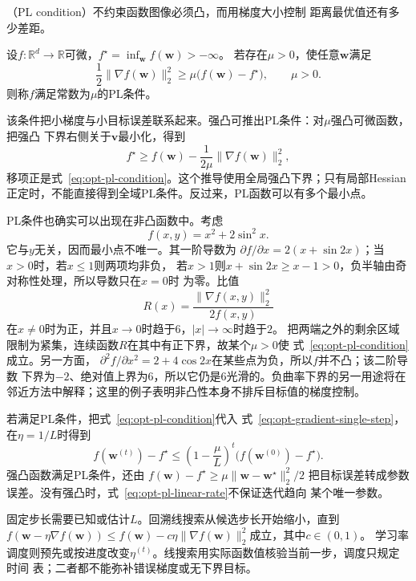 （PL condition）不约束函数图像必须凸，而用梯度大小控制
距离最优值还有多少差距。
\begin{definition}
\label{def:opt-pl-condition}
设$f:\mathbb{R}^d\to\mathbb{R}$可微，$f^\star=\inf_{\bm{w}}f(\bm{w})> -\infty$。
若存在$\mu>0$，使任意$\bm{w}$满足
\begin{equation}
  \frac{1}{2}\lVert\nabla f(\bm{w})\rVert_2^2
  \geq \mu\bigl(f(\bm{w})-f^{\star}\bigr),
  \qquad \mu>0.
  \label{eq:opt-pl-condition}
\end{equation}
则称$f$满足常数为$\mu$的PL条件。
\end{definition}
该条件把小梯度与小目标误差联系起来。强凸可推出PL条件：对$\mu$强凸可微函数，把强凸
下界右侧关于$\bm{v}$最小化，得到
\[
  f^\star\geq
  f(\bm{w})-\frac{1}{2\mu}\lVert\nabla f(\bm{w})\rVert_2^2,
\]
移项正是式~\eqref{eq:opt-pl-condition}。这个推导使用全局强凸下界；只有局部Hessian
正定时，不能直接得到全域PL条件。反过来，PL函数可以有多个最小点。

PL条件也确实可以出现在非凸函数中。考虑
\[
  f(x,y)=x^2+2\sin^2x.
\]
它与$y$无关，因而最小点不唯一。其一阶导数为
$\partial f/\partial x=2(x+\sin 2x)$；当$x>0$时，若$x\leq1$则两项均非负，
若$x>1$则$x+\sin2x\geq x-1>0$，负半轴由奇对称性处理，所以导数只在$x=0$时
为零。比值
\[
  R(x)=\frac{\lVert\nabla f(x,y)\rVert_2^2}{2f(x,y)}
\]
在$x\neq0$时为正，并且$x\to0$时趋于$6$，$|x|\to\infty$时趋于$2$。
把两端之外的剩余区域限制为紧集，连续函数$R$在其中有正下界，故某个$\mu>0$使
式~\eqref{eq:opt-pl-condition}成立。另一方面，
$\partial^2 f/\partial x^2=2+4\cos2x$在某些点为负，所以$f$并不凸；该二阶导数
下界为$-2$、绝对值上界为$6$，所以它仍是$6$光滑的。负曲率下界的另一用途将在
邻近方法中解释；这里的例子表明非凸性本身不排斥目标值的梯度控制。

若满足PL条件，把式~\eqref{eq:opt-pl-condition}代入
式~\eqref{eq:opt-gradient-single-step}，在$\eta=1/L$时得到
\begin{equation}
  f(\bm{w}^{(t)})-f^\star
  \leq
  \left(1-\frac{\mu}{L}\right)^t
  \bigl(f(\bm{w}^{(0)})-f^\star\bigr).
  \label{eq:opt-pl-linear-rate}
\end{equation}
强凸函数满足PL条件，还由
$f(\bm{w})-f^\star\geq\mu\lVert\bm{w}-\bm{w}^{\star}\rVert_2^2/2$
把目标误差转成参数误差。没有强凸时，式~\eqref{eq:opt-pl-linear-rate}不保证迭代趋向
某个唯一参数。

固定步长需要已知或估计$L$。回溯线搜索从候选步长开始缩小，直到
$f(\bm{w}-\eta\nabla f(\bm{w}))\leq
f(\bm{w})-c\eta\lVert\nabla f(\bm{w})\rVert_2^2$成立，其中$c\in(0,1)$。
学习率调度则预先或按进度改变$\eta^{(t)}$。线搜索用实际函数值核验当前一步，调度只规定时间
表；二者都不能弥补错误梯度或无下界目标。

